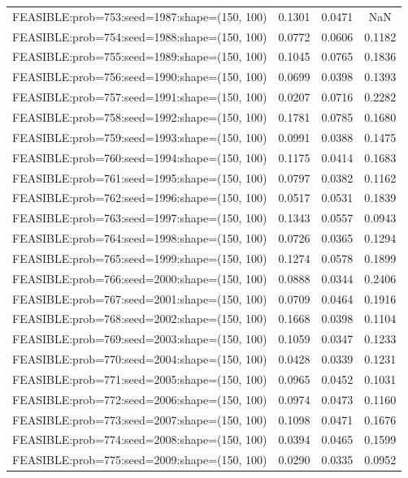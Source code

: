 \begin{longtable}{lccc}
FEASIBLE:prob=753:seed=1987:shape=(150, 100) & 0.1301 & 0.0471 &    NaN \\
FEASIBLE:prob=754:seed=1988:shape=(150, 100) & 0.0772 & 0.0606 & 0.1182 \\
FEASIBLE:prob=755:seed=1989:shape=(150, 100) & 0.1045 & 0.0765 & 0.1836 \\
FEASIBLE:prob=756:seed=1990:shape=(150, 100) & 0.0699 & 0.0398 & 0.1393 \\
FEASIBLE:prob=757:seed=1991:shape=(150, 100) & 0.0207 & 0.0716 & 0.2282 \\
FEASIBLE:prob=758:seed=1992:shape=(150, 100) & 0.1781 & 0.0785 & 0.1680 \\
FEASIBLE:prob=759:seed=1993:shape=(150, 100) & 0.0991 & 0.0388 & 0.1475 \\
FEASIBLE:prob=760:seed=1994:shape=(150, 100) & 0.1175 & 0.0414 & 0.1683 \\
FEASIBLE:prob=761:seed=1995:shape=(150, 100) & 0.0797 & 0.0382 & 0.1162 \\
FEASIBLE:prob=762:seed=1996:shape=(150, 100) & 0.0517 & 0.0531 & 0.1839 \\
FEASIBLE:prob=763:seed=1997:shape=(150, 100) & 0.1343 & 0.0557 & 0.0943 \\
FEASIBLE:prob=764:seed=1998:shape=(150, 100) & 0.0726 & 0.0365 & 0.1294 \\
FEASIBLE:prob=765:seed=1999:shape=(150, 100) & 0.1274 & 0.0578 & 0.1899 \\
FEASIBLE:prob=766:seed=2000:shape=(150, 100) & 0.0888 & 0.0344 & 0.2406 \\
FEASIBLE:prob=767:seed=2001:shape=(150, 100) & 0.0709 & 0.0464 & 0.1916 \\
FEASIBLE:prob=768:seed=2002:shape=(150, 100) & 0.1668 & 0.0398 & 0.1104 \\
FEASIBLE:prob=769:seed=2003:shape=(150, 100) & 0.1059 & 0.0347 & 0.1233 \\
FEASIBLE:prob=770:seed=2004:shape=(150, 100) & 0.0428 & 0.0339 & 0.1231 \\
FEASIBLE:prob=771:seed=2005:shape=(150, 100) & 0.0965 & 0.0452 & 0.1031 \\
FEASIBLE:prob=772:seed=2006:shape=(150, 100) & 0.0974 & 0.0473 & 0.1160 \\
FEASIBLE:prob=773:seed=2007:shape=(150, 100) & 0.1098 & 0.0471 & 0.1676 \\
FEASIBLE:prob=774:seed=2008:shape=(150, 100) & 0.0394 & 0.0465 & 0.1599 \\
FEASIBLE:prob=775:seed=2009:shape=(150, 100) & 0.0290 & 0.0335 & 0.0952 \\

\end{longtable}
